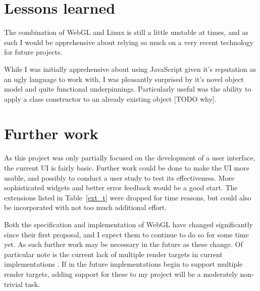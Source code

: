 \documentclass[12pt,twoside,notitlepage]{report}
\begin{document}
\section{Lessons learned}
The combination of WebGL and Linux is still a little unstable at times, and as such I would be apprehensive about relying so much on a very recent technology for future projects.

While I was initially apprehensive about using JavaScript given it's reputation as an ugly language to work with, I was pleasantly surprised by it's novel object model and quite functional underpinnings. Particularly useful was the ability to apply a class constructor to an already existing object [TODO why].

\section{Further work}
As this project was only partially focused on the development of a user interface, the current UI is fairly basic. Further work could be done to make the UI more usable, and possibly to conduct a user study to test its effectiveness. More sophisticated widgets and better error feedback would be a good start. The extensions listed in Table~\ref{ext_t} were dropped for time reasons, but could also be incorporated with not too much additional effort.

Both the specification and implementation of WebGL have changed significantly since their first proposal, and I expect them to continue to do so for some time yet. As such further work may be necessary in the future as these change. Of particular note is the current lack of multiple render targets in current implementations \cite{webgl-future}. If in the future implementations begin to support multiple render targets, adding support for these to my project will be a moderately non-trivial task.

\cleardoublepage



\cleardoublepage

\appendix

\end{document}
